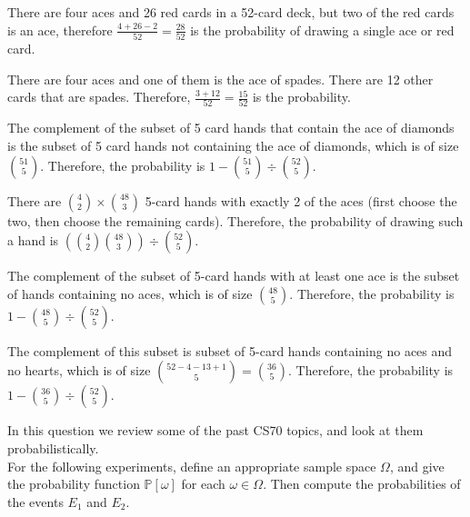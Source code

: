 \documentclass[11pt]{article}
\begin{document}
\begin{solution}

\begin{Parts}
\Part There are four aces and 26 red cards in a 52-card deck, but two of the red
cards is an ace, therefore $\frac{4 + 26 - 2}{52} = \frac{28}{52}$ is the 
probability of drawing a single ace or red card. 

\Part There are four aces and one of them is the ace of spades. There are 12 
other cards that are spades. Therefore, $\frac{3 + 12}{52} = \frac{15}{52}$
is the probability.

\Part The complement of the subset of 5 card hands that contain the ace of 
diamonds is the subset of 5 card hands not containing the ace of diamonds, 
which is of size $\binom{51}{5}$. Therefore, the probability is $1 - 
\binom{51}{5} \div \binom{52}{5}$. 

\Part There are $\binom{4}{2} \times \binom{48}{3}$ 5-card hands with exactly 2 
of the aces (first choose the two, then choose the remaining cards). Therefore,
the probability of drawing such a hand is $\left( \binom{4}{2} \binom{48}{3}
\right) \div \binom{52}{5}$. 

\Part The complement of the subset of 5-card hands with at least one ace is the
subset of hands containing no aces, which is of size $\binom{48}{5}$. Therefore,
the probability is $1 - \binom{48}{5} \div \binom{52}{5}$.

\Part The complement of this subset is subset of 5-card hands containing no aces
and no hearts, which is of size $\binom{52 - 4 - 13 + 1}{5} = \binom{36}{5}$.
Therefore, the probability is $1 - \binom{36}{5} \div \binom{52}{5}$.

\end{Parts}

\end{solution}

In this question we review some of the past CS70 topics, and look at them probabilistically.\\
For the following experiments, define an appropriate sample space $\Omega$, and give the probability function $\mathbb P[\omega]$ for each $\omega \in \Omega$. Then compute the probabilities of the events $E_1$ and $E_2$.\\
\end{document}
